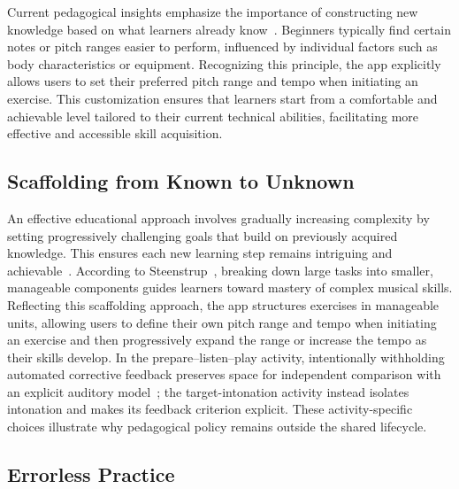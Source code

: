 \documentclass[runningheads]{llncs}
\begin{document}
Current pedagogical insights emphasize the importance of constructing new knowledge based on what learners already know~\cite{Maton09}. Beginners typically find certain notes or pitch ranges easier to perform, influenced by individual factors such as body characteristics or equipment. Recognizing this principle, the app explicitly allows users to set their preferred pitch range and tempo when initiating an exercise. This customization ensures that learners start from a comfortable and achievable level tailored to their current technical abilities, facilitating more effective and accessible skill acquisition.


\subsection{Scaffolding from Known to Unknown}
\label{sec:scaffolding}

An effective educational approach involves gradually increasing complexity by setting progressively challenging goals that build on previously acquired knowledge. This ensures each new learning step remains intriguing and achievable~\cite{Booth09}. According to Steenstrup~\cite{Steen17}, breaking down large tasks into smaller, manageable components guides learners toward mastery of complex musical skills. Reflecting this scaffolding approach, the app structures exercises in manageable units, allowing users to define their own pitch range and tempo when initiating an exercise and then progressively expand the range or increase the tempo as their skills develop. In the prepare--listen--play activity, intentionally withholding automated corrective feedback preserves space for independent comparison with an explicit auditory model~\cite{Guadagnoli01}; the target-intonation activity instead isolates intonation and makes its feedback criterion explicit. These activity-specific choices illustrate why pedagogical policy remains outside the shared lifecycle.


\subsection{Errorless Practice}
\label{sec:errorless_practice}
\end{document}
